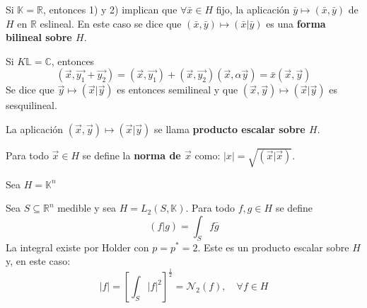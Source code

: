 \documentclass[12pt]{report}
\theoremstyle{largebreak}
\begin{document}
    \begin{obs}
        Si $\mathbb{K}=\mathbb{R}$, entonces 1) y 2) implican que $\forall \bar{x}\in H$ fijo, la aplicación $\bar{y}\mapsto(\bar{x},\bar{y})$ de $H$ en $\mathbb{R}$ eslineal. En este caso se dice que $(\bar{x},\bar{y})\mapsto(\bar{x}\big|\bar{y})$ es una \textbf{forma bilineal sobre $H$}.

        Si $K\mathbb{L}=\mathbb{C}$, entonces
        \begin{equation*}
            (\overrightarrow{x},\overrightarrow{y_1}+\overrightarrow{y_2})=(\overrightarrow{x},\overrightarrow{y_1})+(\overrightarrow{x},\overrightarrow{y_2})
            (\overrightarrow{x},\alpha\overrightarrow{y})=\bar{x}(\overrightarrow{x},\overrightarrow{y})
        \end{equation*}
        Se dice que $\overrightarrow{y}\mapsto(\overrightarrow{x}\big|\overrightarrow{y})$ es entonces semilineal y que $(\overrightarrow{x},\overrightarrow{y})\mapsto(\overrightarrow{x}\big|\overrightarrow{y})$ es sesquilineal.

        La aplicación $(\overrightarrow{x},\overrightarrow{y})\mapsto(\overrightarrow{x}\big|\overrightarrow{y})$ se llama \textbf{producto escalar sobre $H$}.
    \end{obs}

    \begin{mydef}
        Para todo $\overrightarrow{x}\in H$ se define la \textbf{norma de $\overrightarrow{x}$} como: $|x|=\sqrt{(\overrightarrow{x}|\overrightarrow{x})}$.
    \end{mydef}

    \begin{exa}
        Sea $H=\mathbb{K}^n$
    \end{exa}

    \begin{exa}
        Sea $S\subseteq\mathbb{R}^n$ medible y sea $H=L_2(S,\mathbb{K})$. Para todo $f,g\in H$ se define
        \begin{equation*}
            (f\big| g)=\int_Sf\bar{g}
        \end{equation*}
        La integral existe por Holder con $p=p^*=2$. Este es un producto escalar sobre $H$ y, en este caso:
        \begin{equation*}
            |f|=\left[\int_S|f|^2 \right]^{\frac{1}{2}}=\mathcal{N}_2(f),\quad \forall f\in H
        \end{equation*}
    \end{exa}
\end{document}
